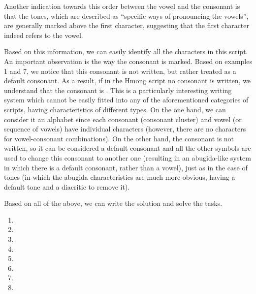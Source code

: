 \begin{refsection}
\begin{mysolution}
Another indication towards this order between the vowel and the consonant is that the tones, which are described as “specific ways of pronouncing the vowels”, are generally marked above the first character, suggesting that the first character indeed refers to the vowel.

Based on this information, we can easily identify all the characters in this script. An important observation is the way the consonant  is marked. Based on examples 1 and 7, we notice that this consonant is not written, but rather treated as a default consonant. As a result, if in the Hmong script no consonant is written, we understand that the consonant is . This is a particularly interesting writing system which cannot be easily fitted into any of the aforementioned categories of scripts, having characteristics of different types. On the one hand, we can consider it an alphabet since each consonant (consonant cluster) and vowel (or sequence of vowels) have individual characters (however, there are no characters for vowel-consonant combinations). On the other hand, the consonant  is not written, so it can be considered a default consonant and all the other symbols are used to change this consonant to another one (resulting in an abugida-like system in which there is a default consonant, rather than a vowel), just as in the case of tones (in which the abugida characteristics are much more obvious, having a default tone and a diacritic to remove it).

Based on all of the above, we can write the solution and solve the tasks.

\begin{solutions}[label=Solution 2.1\alph*]
\item
    \begin{multicols}{2}
    \begin{enumerate}[label = (\arabic*)]
        \item {}
        \item {}
        \item {}
        \item {}
        \item {}
        \item {}
        \item {}
        \item {}
    \end{enumerate}
    \end{multicols}
\end{solutions}


\end{mysolution}
\end{refsection}
